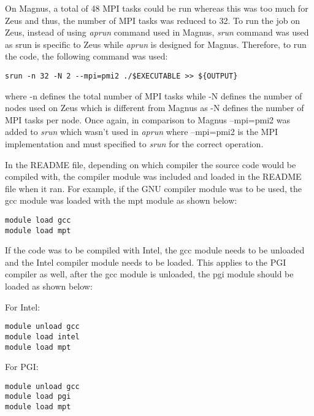 On Magnus, a total of 48 MPI tasks could be run whereas this was too much for Zeus and thus, the number of MPI tasks was reduced to 32. To run the job
on Zeus, instead of using \emph{aprun} command used in Magnus, \emph{srun} command was used as srun is specific to Zeus while \emph{aprun} is designed for Magnus. Therefore,
to run the code, the following command was used:

\begin{tcolorbox}
\begin{Verbatim}[fontsize=\scriptsize]
srun -n 32 -N 2 --mpi=pmi2 ./$EXECUTABLE >> ${OUTPUT}
\end{Verbatim}
\end{tcolorbox}

where -n defines the total number of MPI tasks while -N defines the number of nodes used on Zeus which is different from Magnus as -N defines the number
of MPI tasks per node. Once again, in comparison to Magnus --mpi=pmi2 was added to \emph{srun} which wasn't used in \emph{aprun} where --mpi=pmi2 is the MPI
implementation and must specified to \emph{srun} for the correct operation.

In the README file, depending on which compiler the source code would be compiled with, the compiler module was included and loaded in the README file 
when it ran. For example, if the GNU compiler module was to be used, the gcc module was loaded with the mpt module as shown below:

\begin{tcolorbox}
\begin{Verbatim}[fontsize=\scriptsize]
module load gcc
module load mpt
\end{Verbatim}
\end{tcolorbox}

If the code was to be compiled with Intel, the gcc module needs to be unloaded and the Intel compiler module needs to be loaded. This applies to the PGI
compiler as well, after the gcc module is unloaded, the pgi module should be loaded as shown below:

For Intel:

\begin{tcolorbox}
\begin{Verbatim}[fontsize=\scriptsize]
module unload gcc
module load intel
module load mpt
\end{Verbatim}
\end{tcolorbox}

For PGI: 

\begin{tcolorbox}
\begin{Verbatim}[fontsize=\scriptsize]
module unload gcc
module load pgi
module load mpt
\end{Verbatim}
\end{tcolorbox}

